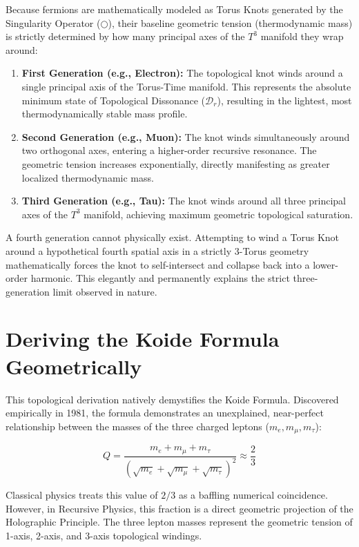 \documentclass[12pt,openany]{book}
\begin{document}
Because fermions are mathematically modeled as Torus Knots generated by the Singularity Operator ($\bigcirc$), their baseline geometric tension (thermodynamic mass) is strictly determined by how many principal axes of the $T^3$ manifold they wrap around:

\begin{enumerate}
    \item \textbf{First Generation (e.g., Electron):} The topological knot winds around a single principal axis of the Torus-Time manifold. This represents the absolute minimum state of Topological Dissonance ($\mathcal{D}_r$), resulting in the lightest, most thermodynamically stable mass profile.
    \item \textbf{Second Generation (e.g., Muon):} The knot winds simultaneously around two orthogonal axes, entering a higher-order recursive resonance. The geometric tension increases exponentially, directly manifesting as greater localized thermodynamic mass.
    \item \textbf{Third Generation (e.g., Tau):} The knot winds around all three principal axes of the $T^3$ manifold, achieving maximum geometric topological saturation.
\end{enumerate}

A fourth generation cannot physically exist. Attempting to wind a Torus Knot around a hypothetical fourth spatial axis in a strictly 3-Torus geometry mathematically forces the knot to self-intersect and collapse back into a lower-order harmonic. This elegantly and permanently explains the strict three-generation limit observed in nature.

\section{Deriving the Koide Formula Geometrically}
This topological derivation natively demystifies the Koide Formula. Discovered empirically in 1981, the formula demonstrates an unexplained, near-perfect relationship between the masses of the three charged leptons ($m_e, m_\mu, m_\tau$):

\begin{equation}
Q = \frac{m_e + m_\mu + m_\tau}{(\sqrt{m_e} + \sqrt{m_\mu} + \sqrt{m_\tau})^2} \approx \frac{2}{3}
\end{equation}

Classical physics treats this value of $2/3$ as a baffling numerical coincidence. However, in Recursive Physics, this fraction is a direct geometric projection of the Holographic Principle. The three lepton masses represent the geometric tension of 1-axis, 2-axis, and 3-axis topological windings. 
\end{document}
